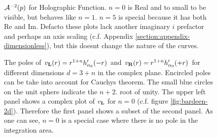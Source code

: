\documentclass[10pt,a4paper, fleqn]{article}
\begin{document}
\begin{figure}
\center
{}
\caption{${\cal A}^{-2}(p)$ for Holographic Function. $n=0$ is Real and to small to be visible, but behaves like $n=1$. $n=5$ is special because it has both Re and Im. Defacto these plots lack another imaginary $i$ prefactor and perhaps an axis scaling (c.f. Appendix \ref{section:appendix-dimensionless}), but this doesnt change the nature of the curves.
 } \label{img:holo-a}
\end{figure}


\begin{figure}
\center
{}
\caption{The poles of $v_{\bf L}(r) = r^{1+n} h'_{\alpha_0}(-r)$ and
$v_{\bf R}(r) = r^{1+n} h'_{\alpha_0}(+r)$ for different dimensions $d=3+n$ in the complex plane. Encircled poles can be take into account for Cauchys theorem.  The small blue circles on the unit sphere indicate the $n+2$. root of unity. The upper left panel shows a complex plot of $v_{\bf L}$ for $n=0$ (c.f. figure \ref{fig:bardeen-2d}). Therefore the first panel shows a subset of the second panel. As one can see, $n=0$ is a special case where there is no pole in the integration area.
 } \label{img:halpha-poles}
\end{figure}
\end{document}
